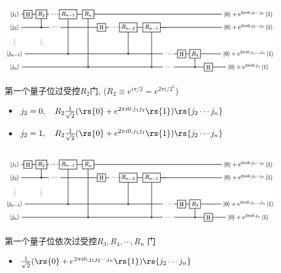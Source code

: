 \begin{frame}
    \frametitle{}
    \begin{center}
        \begin{center}
            \includegraphics[width=0.9\textwidth]{figs/37.png}
        \end{center}
    \end{center}  
    第一个量子位过受控$R_2$门, ($R_2\equiv e^{i\pi/2}= e^{2\pi i /2^2} $)  \\ \vspace{0.3em}
    \begin{itemize}
        \item $j_2=0, \quad R_2 \frac{1}{\sqrt{2}}(\rs{0}+e^{2\pi i 0.j_1 j_2}\rs{1}) \rs{j_2\cdots j_n}$
        \item $j_2=1, \quad R_2 \frac{1}{\sqrt{2}}(\rs{0}+e^{2\pi i 0.j_1 j_2}\rs{1}) \rs{j_2\cdots j_n}$
    \end{itemize}
\end{frame}


\begin{frame}
    \frametitle{}
    \begin{center}
        \begin{center}
            \includegraphics[width=0.9\textwidth]{figs/37.png}
        \end{center}
    \end{center}  
    第一个量子位依次过受控$R_3, R_4, \cdots, R_n$ 门  \\ \vspace{0.3em}
    \begin{itemize}
        \item  $\frac{1}{\sqrt{2}}(\rs{0}+e^{2\pi i 0.j_1 j_2\cdots j_n }\rs{1}) \rs{j_2\cdots j_n}$
    \end{itemize}
\end{frame}

